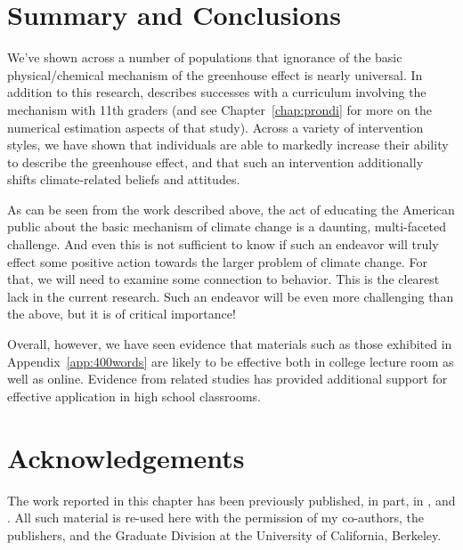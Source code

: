 \section{Summary and Conclusions}

We've shown across a number of populations that ignorance of the basic
physical/chemical mechanism of the greenhouse effect is nearly universal. In
addition to this research, \textcite{felipe_numerical_2012} describes successes
with a curriculum involving the mechanism with 11th graders (and see
Chapter~\ref{chap:prondi} for more on the numerical estimation aspects of that
study). Across a variety of intervention styles, we have shown that individuals
are able to markedly increase their ability to describe the greenhouse effect,
and that such an intervention additionally shifts climate-related beliefs and
attitudes.


As can be seen from the work described above, the act of educating the American
public about the basic mechanism of climate change is a daunting, multi-faceted
challenge. And even this is not sufficient to know if such an endeavor will
truly effect some positive action towards the larger problem of climate change.
For that, we will need to examine some connection to behavior. This is the
clearest lack in the current research. Such an endeavor will be even more
challenging than the above, but it is of critical importance! 

Overall, however, we have seen evidence that materials such as those exhibited
in Appendix~\ref{app:400words} are likely to be effective both in college
lecture room as well as online. Evidence from related studies has provided
additional support for effective application in high school classrooms.



\section*{Acknowledgements}

The work reported in this chapter has been previously published, in part, in
\textcite{ranney_changing_2012,ranney_improving_2012_f}, and
\textcite{clark_knowledge_inpress}.  All such material is re-used here with the
permission of my co-authors, the publishers, and the Graduate Division at the
University of California, Berkeley.
